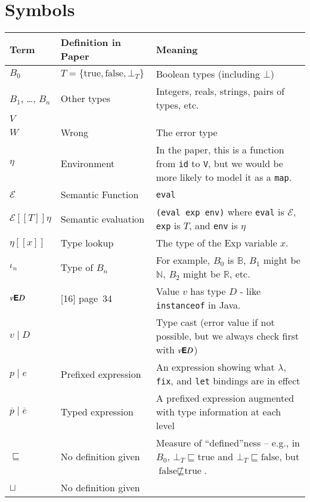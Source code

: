 \documentclass[12pt]{article}
\newcommand{\B}{\mathbb{B}}
\newcommand{\N}{\mathbb{N}}
\newcommand{\R}{\mathbb{R}}
\newcommand{\instanceof}[2]{#1\textsf{\textbf{E}}#2}
\newcommand{\cast}[2]{#1\mid#2}
\newcommand{\pe}[2]{#1\mid#2}
\newcommand{\tpe}[2]{\overline{#1}\mid\overline{#2}}
\newcommand{\eval}[1]{\mathscr{E}[\![#1]\!]\eta}
\newcommand{\env}[1]{\eta[\![#1]\!]}
\begin{document}
\section{Symbols}

\begin{tabular}{l p{} p{}}
\toprule
Term & Definition in Paper & Meaning \\
\midrule
$B_0$ & $T = \{\text{true}, \text{false}, \bot_T\}$ & Boolean types (including $\bot$) \\
$B_1$, \ldots, $B_n$ & Other types & Integers, reals, strings, pairs of types, etc. \\
$V$ &  & \\
$W$ & Wrong & The error type \\
$\eta$ & Environment & In the paper, this is a function from \texttt{id} to \texttt{V}, but we would be more likely to model it as a \texttt{map}.\\
$\mathscr{E}$   & Semantic Function & \texttt{eval} \\
$\eval{T}$ & Semantic evaluation & \texttt{(eval exp env)} where \texttt{eval} is $\mathscr{E}$, \texttt{exp} is $T$, and \texttt{env} is $\eta$ \\
$\env{x}$ & Type lookup & The type of the Exp variable $x$. \\
$\iota_n$ & Type of $B_n$ & For example, $B_0$ is $\B$, $B_1$ might be $\N$, $B_2$ might be $\R$, etc. \\
$\instanceof{v}{D}$ & [16] page~34 & Value $v$ has type $D$ - like \texttt{instanceof} in Java. \\
$\cast{v}{D}$ & & Type cast (error value if not possible, but we always check first with $\instanceof{v}{D}$) \\

$\pe{p}{e}$ & Prefixed expression & An expression showing what $\lambda$, \texttt{fix}, and \texttt{let} bindings are in effect \\
$\tpe{p}{e}$ & Typed expression &  A prefixed expression augmented with type information at each level \\
$\sqsubseteq$ & No definition given & Measure of ``defined''ness -- e.g., in $B_0$, $\bot_T \sqsubseteq \text{true}$ and $\bot_T \sqsubseteq \text{false}$, but $\text{false} \nsqsubseteq \text{true}$. \\
$\sqcup$ & No definition given & \\

\bottomrule
\end{tabular}
\end{document}
